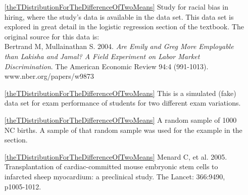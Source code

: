 \begin{itemize}
\item[\ref{theTDistributionForTheDifferenceOfTwoMeans}]
    Study for racial bias in hiring, where the study's data is available
    in the  data set.
    This data set is explored in great detail in the logistic regression
    section of the  textbook.
    The original source for this data is:\\
    Bertrand M, Mullainathan S. 2004.
    \emph{Are Emily and Greg More Employable than Lakisha and Jamal?
    A Field Experiment on Labor Market Discrimination}.
    The American Economic Review 94:4 (991-1013).
        {www.nber.org/papers/w9873}

\item[\ref{theTDistributionForTheDifferenceOfTwoMeans}]
    This is a simulated (fake) data set for exam performance
    of students for two different exam variations.

\item[\ref{theTDistributionForTheDifferenceOfTwoMeans}]
    A random sample of 1000 NC births.
    A sample of that random sample was used for the example
    in the section.

\item[\ref{theTDistributionForTheDifferenceOfTwoMeans}]
        {Menard C, et al. 2005.
            Transplantation of cardiac-committed mouse embryonic
            stem cells to infarcted sheep myocardium:
            a preclinical study.
            The Lancet: 366:9490, p1005-1012.}

\end{itemize}







